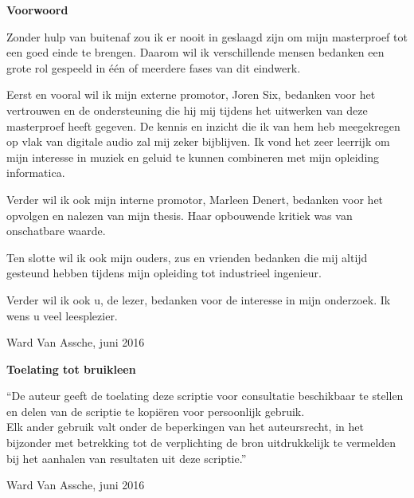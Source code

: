 
\newpage

\noindent \textbf{\huge Voorwoord}

\vspace{1.5cm}

\noindent

Zonder hulp van buitenaf zou ik er nooit in geslaagd zijn om mijn masterproef tot een goed einde te brengen. Daarom wil ik verschillende mensen bedanken een grote rol gespeeld in één of meerdere fases van dit eindwerk.

Eerst en vooral wil ik mijn externe promotor, Joren Six, bedanken voor het vertrouwen en de ondersteuning die hij mij tijdens het uitwerken van deze masterproef heeft gegeven. De kennis en inzicht die ik van hem heb meegekregen op vlak van digitale audio zal mij zeker bijblijven. Ik vond het zeer leerrijk om mijn interesse in muziek en geluid te kunnen combineren met mijn opleiding informatica.

Verder wil ik ook mijn interne promotor, Marleen Denert, bedanken voor het opvolgen en nalezen van mijn thesis. Haar opbouwende kritiek was van onschatbare waarde.

Ten slotte wil ik ook mijn ouders, zus en vrienden bedanken die mij altijd gesteund hebben tijdens mijn opleiding tot industrieel ingenieur.

Verder wil ik ook u, de lezer, bedanken voor de interesse in mijn onderzoek. Ik wens u veel leesplezier.

\addvspace{2.5cm}

\noindent Ward Van Assche, juni 2016\newpage

\noindent \textbf{\huge Toelating tot bruikleen}

\vspace{1.5cm}

\noindent
``De auteur geeft de toelating deze scriptie voor consultatie beschikbaar
te stellen en delen van de scriptie te kopi\"eren voor persoonlijk
gebruik.\\
Elk ander gebruik valt onder de beperkingen van het auteursrecht,
in het bijzonder met betrekking tot de verplichting de bron uitdrukkelijk
te vermelden bij het aanhalen van resultaten uit deze scriptie.''

\addvspace{4cm}

\noindent Ward Van Assche, juni 2016
